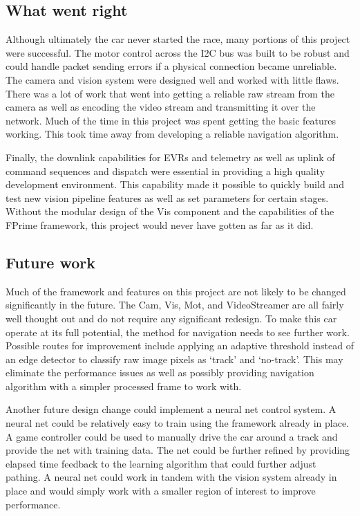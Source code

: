 \documentclass{article}
\begin{document}
\subsection{What went right}

Although ultimately the car never started the race, many portions of this project were successful. The motor control across the I2C bus was built to be robust and could handle packet sending errors if a physical connection became unreliable. The camera and vision system were designed well and worked with little flaws. There was a lot of work that went into getting a reliable raw stream from the camera as well as encoding the video stream and transmitting it over the network. Much of the time in this project was spent getting the basic features working. This took time away from developing a reliable navigation algorithm.

Finally, the downlink capabilities for EVRs and telemetry as well as uplink of command sequences and dispatch were essential in providing a high quality development environment. This capability made it possible to quickly build and test new vision pipeline features as well as set parameters for certain stages. Without the modular design of the Vis component and the capabilities of the FPrime framework, this project would never have gotten as far as it did.

\subsection{Future work}

Much of the framework and features on this project are not likely to be changed significantly in the future. The Cam, Vis, Mot, and VideoStreamer are all fairly well thought out and do not require any significant redesign. To make this car operate at its full potential, the method for navigation needs to see further work. Possible routes for improvement include applying an adaptive threshold instead of an edge detector to classify raw image pixels as `track' and `no-track'. This may eliminate the performance issues as well as possibly providing navigation algorithm with a simpler processed frame to work with.

Another future design change could implement a neural net control system. A neural net could be relatively easy to train using the framework already in place. A game controller could be used to manually drive the car around a track and provide the net with training data. The net could be further refined by providing elapsed time feedback to the learning algorithm that could further adjust pathing. A neural net could work in tandem with the vision system already in place and would simply work with a smaller region of interest to improve performance.
\end{document}
